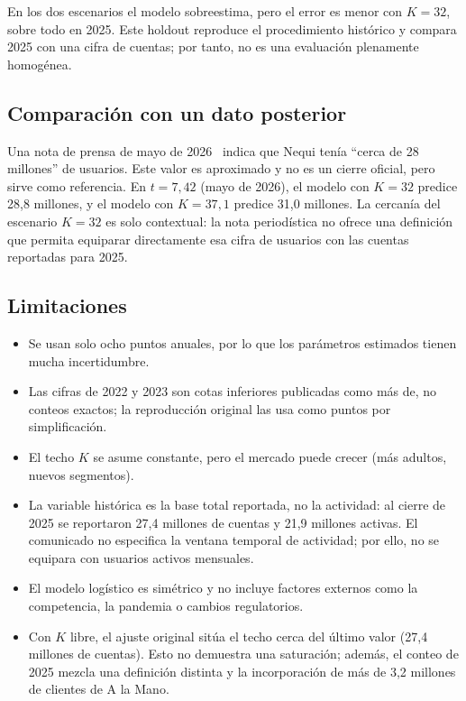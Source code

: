 \documentclass[12pt,a4paper]{article}
\begin{document}
En los dos escenarios el modelo sobreestima, pero el error es menor con $K=32$, sobre todo en 2025. Este holdout reproduce el procedimiento histórico y compara 2025 con una cifra de cuentas; por tanto, no es una evaluación plenamente homogénea.

\subsection{Comparaci\'on con un dato posterior}
Una nota de prensa de mayo de 2026~\cite{bluradio2026} indica que Nequi ten\'ia ``cerca de 28 millones'' de usuarios. Este valor es aproximado y no es un cierre oficial, pero sirve como referencia. En $t=7{,}42$ (mayo de 2026), el modelo con $K=32$ predice 28{,}8 millones, y el modelo con $K=37{,}1$ predice 31{,}0 millones. La cercan\'ia del escenario $K=32$ es solo contextual: la nota period\'istica no ofrece una definici\'on que permita equiparar directamente esa cifra de usuarios con las cuentas reportadas para 2025.

\subsection{Limitaciones}
\begin{itemize}
  \item Se usan solo ocho puntos anuales, por lo que los par\'ametros estimados tienen mucha incertidumbre.
  \item Las cifras de 2022 y 2023 son cotas inferiores publicadas como más de, no conteos exactos; la reproducción original las usa como puntos por simplificación.
  \item El techo $K$ se asume constante, pero el mercado puede crecer (m\'as adultos, nuevos segmentos).
  \item La variable histórica es la base total reportada, no la actividad: al cierre de 2025 se reportaron 27{,}4 millones de cuentas y 21{,}9 millones activas. El comunicado no especifica la ventana temporal de actividad; por ello, no se equipara con usuarios activos mensuales.~\cite{cibest4t25}
  \item El modelo log\'istico es sim\'etrico y no incluye factores externos como la competencia, la pandemia o cambios regulatorios.
  \item Con $K$ libre, el ajuste original sit\'ua el techo cerca del \'ultimo valor (27{,}4 millones de cuentas). Esto no demuestra una saturaci\'on; adem\'as, el conteo de 2025 mezcla una definici\'on distinta y la incorporaci\'on de m\'as de 3,2 millones de clientes de A la Mano.~\cite{cibestannual2025}
\end{itemize}
\end{document}
